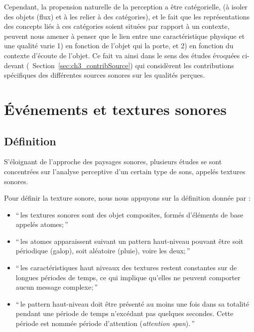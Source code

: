 Cependant, la propension naturelle de la perception a être catégorielle, (à isoler des objets (flux) et à les relier à des catégories), et le fait que les représentations des concepts liés à ces catégories soient situées par rapport à un contexte, peuvent nous amener à penser que le lien entre une caractéristique physique et une qualité varie 1) en fonction de l'objet qui la porte, et 2) en fonction du contexte d'écoute de l'objet. Ce fait va ainsi dans le sens des études évoquées ci-devant (\cf~Section~\ref{sec:ch3_contribSource}) qui considèrent les contributions spécifiques des différentes sources sonores sur les qualités perçues.


\section{Événements et textures sonores}
\label{sec:ch3_eventTexture}

\subsection{Définition}
\label{sec:ch3_textureDef}

S'éloignant de l'approche des paysages sonores, plusieurs études se sont concentrées sur l'analyse perceptive d'un certain type de sons, appelés textures sonores.

Pour définir la texture sonore, nous nous appuyons sur la définition donnée par \citep[p. 25]{saint1995classification}:  

\begin{itemize}
\item ``\,les textures sonores sont des objet composites, formés d'éléments de base appelés atomes;\,''
\item ``\,les atomes apparaissent suivant un pattern haut-niveau pouvant être soit périodique (galop), soit aléatoire (pluie), voire les deux;\,''
\item ``\,les caractéristiques haut niveaux des textures restent constantes sur de longues périodes de temps, ce qui implique qu'elles ne peuvent comporter aucun message complexe;\,''
\item ``\,le pattern haut-niveau doit être présenté au moins une fois dans sa totalité pendant une période de temps n’excédant pas quelques secondes. Cette période est nommée période d'attention (\emph{attention span}).\,''
\end{itemize}

